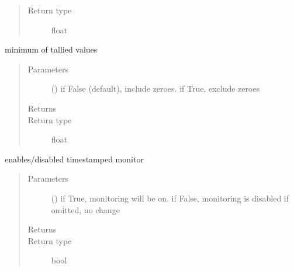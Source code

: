 \documentclass[letterpaper,10pt,english]{sphinxmanual}
\begin{document}
\begin{fulllineitems}
\begin{fulllineitems}
\begin{quote}
\begin{description}
\item[{Return type}] \leavevmode
float

\end{description}\end{quote}

\end{fulllineitems}


\begin{fulllineitems}
\label{\detokenize{Reference:salabim.MonitorTimestamp.minimum}}
minimum of tallied values
\begin{quote}\begin{description}
\item[{Parameters}] \leavevmode
{} () \textendash{} if False (default), include zeroes. if True, exclude zeroes

\item[{Returns}] \leavevmode
{}

\item[{Return type}] \leavevmode
float

\end{description}\end{quote}

\end{fulllineitems}


\begin{fulllineitems}
\label{\detokenize{Reference:salabim.MonitorTimestamp.monitor}}
enables/disabled timestamped monitor
\begin{quote}\begin{description}
\item[{Parameters}] \leavevmode
{} () \textendash{} if True, monitoring will be on. 
if False, monitoring is disabled 
if omitted, no change

\item[{Returns}] \leavevmode
{}

\item[{Return type}] \leavevmode
bool


\end{description}
\end{quote}
\end{fulllineitems}
\end{fulllineitems}
\end{document}
